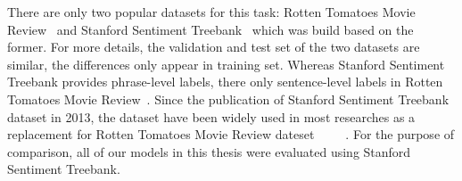 There are only two popular datasets for this task: Rotten Tomatoes Movie Review~\cite{Rotten-Tomato} and Stanford Sentiment Treebank~\cite{socher2013recursive} which was build based on the former.
For more details, the validation and test set of the two datasets are similar, the differences only appear in training set.
Whereas Stanford Sentiment Treebank provides phrase-level labels, there only sentence-level labels in Rotten Tomatoes Movie Review~\cite{socher2013recursive}.
Since the publication of Stanford Sentiment Treebank dataset in 2013, the dataset have been widely used in most researches as a replacement for Rotten Tomatoes Movie Review dateset~\cite{treeLSTM}~\cite{KimCNN}~\cite{cnn-rnn}~\cite{2-layer-cnn}~\cite{socher2013recursive}.
For the purpose of comparison, all of our models in this thesis were evaluated using Stanford Sentiment Treebank.

